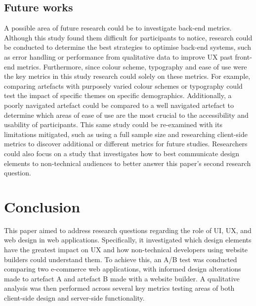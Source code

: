\documentclass[article]{IEEEtran}
\begin{document}
        \subsection{Future works}
            A possible area of future research could be to investigate back-end metrics. Although this study found them difficult for participants to notice, research could be conducted to determine the best strategies to optimise back-end systems, such as error handling or performance from qualitative data to improve UX past front-end metrics. Furthermore, since colour scheme, typography and ease of use were the key metrics in this study research could solely on these metrics. For example, comparing artefacts with purposely varied colour schemes or typography could test the impact of specific themes on specific demographics. Additionally, a poorly navigated artefact could be compared to a well navigated artefact to determine which areas of ease of use are the most crucial to the accessibility and usability of participants. This same study could be re-examined with its limitations mitigated, such as using a full sample size and researching client-side metrics to discover additional or different metrics for future studies. Researchers could also focus on a study that investigates how to best communicate design elements to non-technical audiences to better answer this paper's second research question.

    \section{Conclusion}
        This paper aimed to address research questions regarding the role of UI, UX, and web design in web applications. Specifically, it investigated which design elements have the greatest impact on UX and how non-technical developers using website builders could understand them. To achieve this, an A/B test was conducted comparing two e-commerce web applications, with informed design alterations made to artefact A and artefact B made with a website builder. A qualitative analysis was then performed across several key metrics testing areas of both client-side design and server-side functionality. 
        
\end{document}
